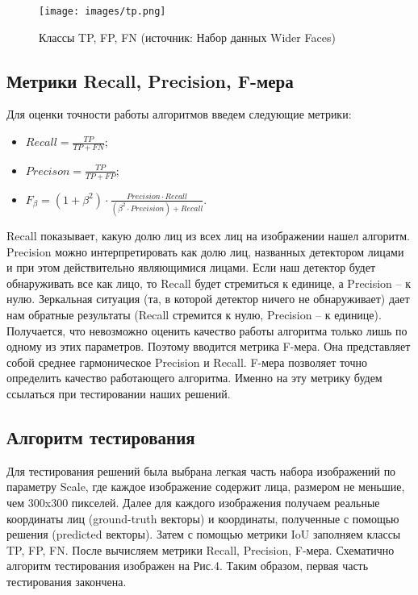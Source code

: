 \documentclass[14pt]{matmex-diploma-custom}
\begin{document}
 \begin{figure}[h]
            \centering
            \texttt{[image: images/tp.png]}
            \caption{Классы TP, FP, FN (источник: Набор данных Wider Faces)}
    \end{figure}
    
 \subsection{Метрики Recall, Precision, F-мера}
    Для оценки точности работы алгоритмов введем следующие метрики:
    \begin{itemize}
        \item $Recall = \frac{TP}{TP+FN}$; 
        \item $Precison = \frac{TP}{TP+FP}$;
        \item $F_\beta = (1+\beta^2)\cdot\frac{Precision\cdot Recall}{(\beta^2\cdot Precision) + Recall}$.
    \end{itemize}
    Recall показывает, какую долю лиц из всех лиц на изображении нашел алгоритм. Precision можно интерпретировать как долю лиц, названных детектором лицами и при этом действительно являющимися лицами. Если наш детектор будет обнаруживать все как лицо, то Recall будет стремиться к единице, а Precision -- к нулю. Зеркальная ситуация (та, в которой детектор ничего не обнаруживает) дает нам обратные результаты (Recall стремится к нулю, Precision -- к единице).
    Получается, что невозможно оценить качество работы алгоритма только лишь по одному из этих параметров. Поэтому вводится метрика F-мера. Она представляет собой среднее гармоническое Precision и Recall. F-мера позволяет точно определить качество работающего алгоритма. Именно на эту метрику будем ссылаться при тестировании наших решений.
    
 \subsection{Алгоритм тестирования}
 
 Для тестирования решений была выбрана легкая часть набора изображений по параметру Scale, где каждое изображение содержит лица, размером не меньшие, чем 300x300 пикселей. Далее для каждого изображения получаем реальные координаты лиц (ground-truth векторы) и координаты, полученные с помощью решения (predicted векторы). Затем с помощью метрики IoU заполняем классы TP, FP, FN. После вычисляем метрики Recall, Precision, F-мера. Схематично алгоритм тестирования изображен на Рис.4. Таким образом, первая часть тестирования закончена.
 
\end{document}
